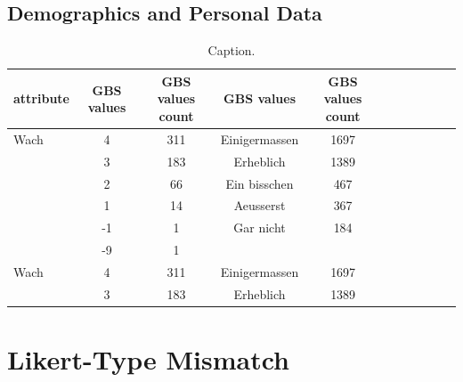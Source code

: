 \subsection{Demographics and Personal Data}

\begin{table}[ht]
    \begin{center}
            {\footnotesize
            \begin{tabular}{l|c|ccccccccc}
                \hline \hline
		attribute & GBS values & GBS values count &  GBS values & GBS values count \\
                \hline \hline
                     Wach & 4 & 311 & Einigermassen & 1697 \\
                     & 3 & 183 & Erheblich & 1389 \\
                     & 2 & 66 & Ein bisschen & 467 \\ 
              	& 1 & 14 & Aeusserst & 367 \\	
		& -1 & 1 & Gar nicht & 184 \\		
		& -9 & 1 & & \\
		\hline
		Wach & 4 & 311 & Einigermassen & 1697 \\
                     & 3 & 183 & Erheblich & 1389 \\
            \end{tabular}}
        \caption{Caption.}
\end{center}
\end{table}

\section{Likert-Type Mismatch}

